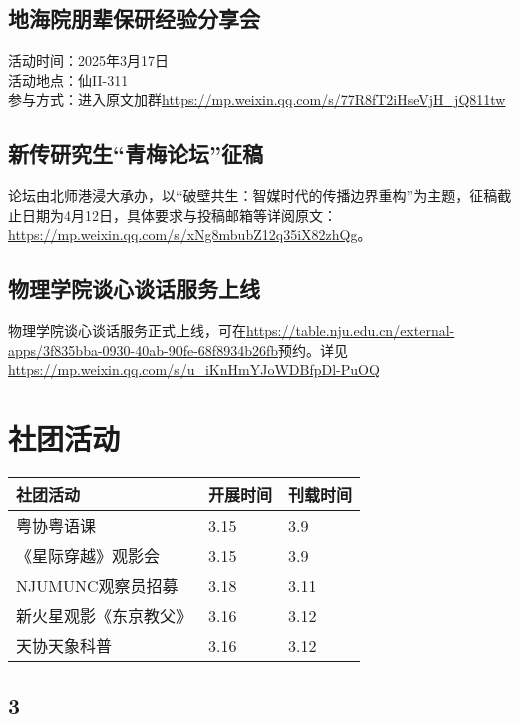 \documentclass[letterpaper, 12pt]{article}
\begin{document}
\begin{multicols}{2}
\subsection{地海院朋辈保研经验分享会}
活动时间：2025年3月17日\\
活动地点：仙II-311\\
参与方式：进入原文加群\url{https://mp.weixin.qq.com/s/77R8fT2iHseVjH_jQ811tw}

\subsection{新传研究生“青梅论坛”征稿}
论坛由北师港浸大承办，以“破壁共生：智媒时代的传播边界重构”为主题，征稿截止日期为4月12日，具体要求与投稿邮箱等详阅原文：\url{https://mp.weixin.qq.com/s/xNg8mbubZ12q35iX82zhQg}。

\subsection{物理学院谈心谈话服务上线}
物理学院谈心谈话服务正式上线，可在\url{https://table.nju.edu.cn/external-apps/3f835bba-0930-40ab-90fe-68f8934b26fb}预约。详见\url{https://mp.weixin.qq.com/s/u_iKnHmYJoWDBfpDl-PuOQ}
\section{社团活动}
\begin{tabular}{|>{\centering\arraybackslash}m{}|m{}|m{}|}
    \hline
    社团活动 & 开展时间 & 刊载时间\\
    \hline\hline
    粤协粤语课 & 3.15 & 3.9\\
    《星际穿越》观影会 & 3.15 & 3.9\\
    NJUMUNC观察员招募 & 3.18 & 3.11\\
    新火星观影《东京教父》 & 3.16 & 3.12\\
    天协天象科普 & 3.16 & 3.12\\
    \hline
\end{tabular}
\subsection{3}



\end{multicols}
\end{document}
